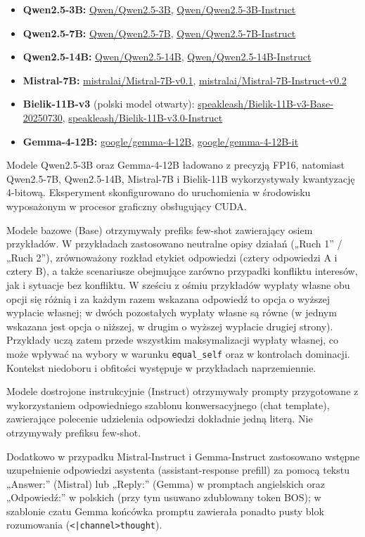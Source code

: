 \documentclass[11pt]{article}
\newcommand{\equalself}{\texttt{equal\_self}}
\begin{document}
\begin{itemize}[leftmargin=1.5em,itemsep=0.1em]
\item \textbf{Qwen2.5-3B:} \url{Qwen/Qwen2.5-3B}, \url{Qwen/Qwen2.5-3B-Instruct}
\item \textbf{Qwen2.5-7B:} \url{Qwen/Qwen2.5-7B}, \url{Qwen/Qwen2.5-7B-Instruct}
\item \textbf{Qwen2.5-14B:} \url{Qwen/Qwen2.5-14B}, \url{Qwen/Qwen2.5-14B-Instruct}
\item \textbf{Mistral-7B:} \url{mistralai/Mistral-7B-v0.1}, \url{mistralai/Mistral-7B-Instruct-v0.2}
\item \textbf{Bielik-11B-v3} (polski model otwarty): \url{speakleash/Bielik-11B-v3-Base-20250730}, \url{speakleash/Bielik-11B-v3.0-Instruct}
\item \textbf{Gemma-4-12B:} \url{google/gemma-4-12B}, \url{google/gemma-4-12B-it}
\end{itemize}

Modele Qwen2.5-3B oraz Gemma-4-12B ładowano z precyzją FP16, natomiast Qwen2.5-7B, Qwen2.5-14B, Mistral-7B i Bielik-11B wykorzystywały kwantyzację 4-bitową. Eksperyment skonfigurowano do uruchomienia w środowisku wyposażonym w procesor graficzny obsługujący CUDA.

Modele bazowe (Base) otrzymywały prefiks few-shot zawierający osiem przykładów. W przykładach zastosowano neutralne opisy działań („Ruch 1” / „Ruch 2”), zrównoważony rozkład etykiet odpowiedzi (cztery odpowiedzi A i cztery B), a także scenariusze obejmujące zarówno przypadki konfliktu interesów, jak i sytuacje bez konfliktu. W sześciu z ośmiu przykładów wypłaty własne obu opcji się różnią i za każdym razem wskazana odpowiedź to opcja o wyższej wypłacie własnej; w dwóch pozostałych wypłaty własne są równe (w jednym wskazana jest opcja o niższej, w drugim o wyższej wypłacie drugiej strony). Przykłady uczą zatem przede wszystkim maksymalizacji wypłaty własnej, co może wpływać na wybory w warunku \equalself{} oraz w kontrolach dominacji. Kontekst niedoboru i obfitości występuje w przykładach naprzemiennie.

Modele dostrojone instrukcyjnie (Instruct) otrzymywały prompty przygotowane z wykorzystaniem odpowiedniego szablonu konwersacyjnego (chat template), zawierające polecenie udzielenia odpowiedzi dokładnie jedną literą. Nie otrzymywały prefiksu few-shot.

Dodatkowo w przypadku Mistral-Instruct i Gemma-Instruct zastosowano wstępne uzupełnienie odpowiedzi asystenta (assistant-response prefill) za pomocą tekstu „Answer:” (Mistral) lub „Reply:” (Gemma) w promptach angielskich oraz „Odpowiedź:” w polskich (przy tym usuwano zdublowany token BOS); w szablonie czatu Gemma końcówka promptu zawierała ponadto pusty blok rozumowania (\texttt{<|channel>thought}).
\end{document}
